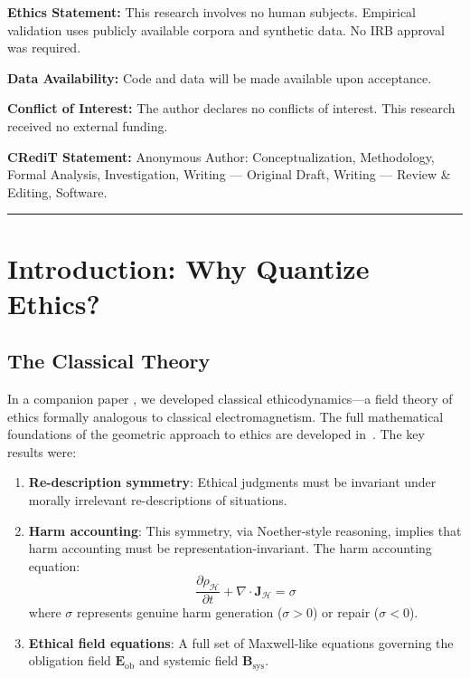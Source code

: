 \documentclass[12pt]{article}
\begin{document}
\noindent\textbf{Ethics Statement:} This research involves no human subjects. Empirical validation uses publicly available corpora and synthetic data. No IRB approval was required.

\noindent\textbf{Data Availability:} Code and data will be made available upon acceptance.

\noindent\textbf{Conflict of Interest:} The author declares no conflicts of interest. This research received no external funding.

\noindent\textbf{CRediT Statement:} Anonymous Author: Conceptualization, Methodology, Formal Analysis, Investigation, Writing --- Original Draft, Writing --- Review \& Editing, Software.
\noindent\rule{\linewidth}{0.4pt}
\normalsize
\vspace{1em}

\tableofcontents

\newpage

\section{Introduction: Why Quantize Ethics?}

\subsection{The Classical Theory}

In a companion paper \cite{bond2025noether}, we developed classical ethicodynamics---a field theory of ethics formally analogous to classical electromagnetism. The full mathematical foundations of the geometric approach to ethics are developed in~\cite{bond2026ge}. The key results were:

\begin{enumerate}
    \item \textbf{Re-description symmetry}: Ethical judgments must be invariant under morally irrelevant re-descriptions of situations.

    \item \textbf{Harm accounting}: This symmetry, via Noether-style reasoning, implies that harm accounting must be representation-invariant. The harm accounting equation:
    \begin{equation}
        \frac{\partial \rho_{\mathcal{H}}}{\partial t} + \nabla \cdot \mathbf{J}_{\mathcal{H}} = \sigma
    \end{equation}
    where $\sigma$ represents genuine harm generation ($\sigma > 0$) or repair ($\sigma < 0$).

    \item \textbf{Ethical field equations}: A full set of Maxwell-like equations governing the obligation field $\mathbf{E}_{\text{ob}}$ and systemic field $\mathbf{B}_{\text{sys}}$.
\end{enumerate}
\end{document}
